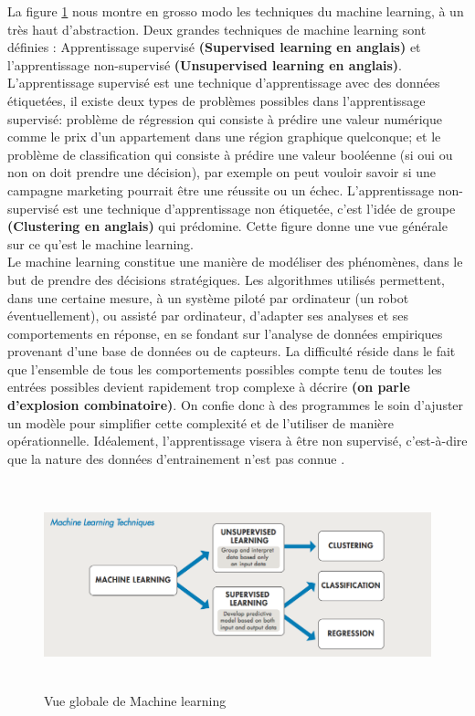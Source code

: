 \documentclass[12pt, french]{report}
\begin{document}
La figure \ref{machinelearning} nous montre en grosso modo les techniques du machine learning, à un très haut d'abstraction. Deux grandes techniques de machine learning sont définies : Apprentissage supervisé \textbf{(Supervised learning en anglais)} et l'apprentissage non-supervisé \textbf{(Unsupervised learning en anglais)}. L'apprentissage supervisé est une technique d'apprentissage avec des données étiquetées, il existe deux types de problèmes possibles dans l'apprentissage supervisé: problème de régression qui consiste à prédire une valeur numérique comme le prix d'un appartement dans une région graphique quelconque; et le problème de classification qui consiste à prédire une valeur booléenne (si oui ou non on doit prendre une décision), par exemple on peut vouloir savoir si une campagne marketing pourrait être une réussite ou un échec. L'apprentissage non-supervisé est une technique d'apprentissage non étiquetée, c'est l'idée de groupe \textbf{(Clustering en anglais)} qui prédomine.  Cette figure donne une vue générale sur ce qu'est le machine learning.\\

Le machine learning constitue une manière de modéliser des phénomènes, dans le but de prendre des décisions stratégiques. Les algorithmes utilisés permettent, dans une certaine mesure, à un système piloté par ordinateur (un robot éventuellement), ou assisté par ordinateur, d'adapter ses analyses et ses comportements en réponse, en se fondant sur l'analyse de données empiriques provenant d'une base de données ou de capteurs. La difficulté réside dans le fait que l'ensemble de tous les comportements possibles compte tenu de toutes les entrées possibles devient rapidement trop complexe à décrire \textbf{(on parle d'explosion combinatoire)}. On confie donc à des programmes le soin d'ajuster un modèle pour simplifier cette complexité et de l'utiliser de manière opérationnelle. Idéalement, l'apprentissage visera à être non supervisé, c'est-à-dire que la nature des données d'entrainement n'est pas connue \cite{key13}.

\begin{figure}[h]
\includegraphics[width=15cm, height=6cm]{images/machinelearning.png}
\caption{Vue globale de Machine learning \cite{key24}}
\label{machinelearning}
\end{figure}
\end{document}
